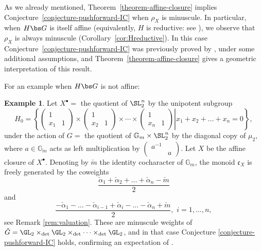 \documentclass[final]{amsart}
\theoremstyle{remark}
\theoremstyle{definition}
\newtheorem{eg}[subsubsection]{Example}
\numberwithin{equation}{section}
\begin{document}
\smallskip

As we already mentioned, Theorem~\ref{theorem-affine-closure} implies Conjecture~\ref{conjecture-pushforward-IC} when $\rho_X$ is minuscule. 
In particular, when $H\bs G$ is itself affine (equivalently, $H$ is reductive: see \cite{Lun73,Richardson}),
we observe that $\rho_X$ is always minuscule (Corollary~\ref{cor:Hreductive}). In this case
Conjecture~\ref{conjecture-pushforward-IC} was previously proved by \cite[Theorem 7.2.1]{SaSph}, under some additional assumptions,
and Theorem~\ref{theorem-affine-closure} gives a geometric interpretation of this result.


For an example when $H\bs G$ is not affine:

\begin{eg}\label{example-nfold}
Let $X^\bullet=$ the quotient of $\SL_2^n$ by the unipotent subgroup 
\[ H_0= \left\{ \left.\left(\begin{array}{cc} 1 \\ x_1 & 1\end{array}\right) \times \left(\begin{array}{cc} 1 \\ x_2 & 1\end{array}\right) \times \cdots \times\left(\begin{array}{cc} 1 \\ x_n & 1\end{array}\right) \right| x_1+ x_2 + \dots+ x_n = 0\right\},\]
under the action of $G = $ the quotient of $\mathbb G_m \times \SL_2^n$ by the diagonal copy of $\mu_2$, where $a\in \mathbb G_m$ acts as left multiplication by $\begin{pmatrix} a^{-1} \\ & a\end{pmatrix}$. 
Let $X$ be the affine closure of $X^\bullet$. Denoting by $\check m$ the identity cocharacter of $\mathbb G_m$, the monoid $\mathfrak c_X$ is freely generated by the coweights
\[ \frac{\check\alpha_1+\check\alpha_2+\dots+\check\alpha_n - \check m}{2}\]
and 
\[ \frac{-\check\alpha_1- \dots - \check\alpha_{i-1} + \check\alpha_i - \dots -\check\alpha_n + \check m}{2}, \,\, i =1,\dots, n,\]
see Remark \ref{rem:valuation}. These are minuscule weights of $\check G= \GL_2\times_{\det} \GL_2 \times_{\det} \cdots \times_{\det}\GL_2$, and in that case Conjecture \ref{conjecture-pushforward-IC} holds, confirming an expectation of \cite[\S 4.5]{SaRS}.  
\end{eg}
\end{document}
